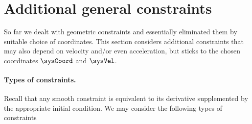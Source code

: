 \section{Additional general constraints}
So far we dealt with geometric constraints and essentially eliminated them by suitable choice of coordinates.
This section considers additional constraints that may also depend on velocity and/or even acceleration, but sticks to the chosen coordinates $\sysCoord$ and $\sysVel$.

\paragraph{Types of constraints.}
Recall that any smooth constraint is equivalent to its derivative supplemented by the appropriate initial condition.
We may consider the following types of constraints
